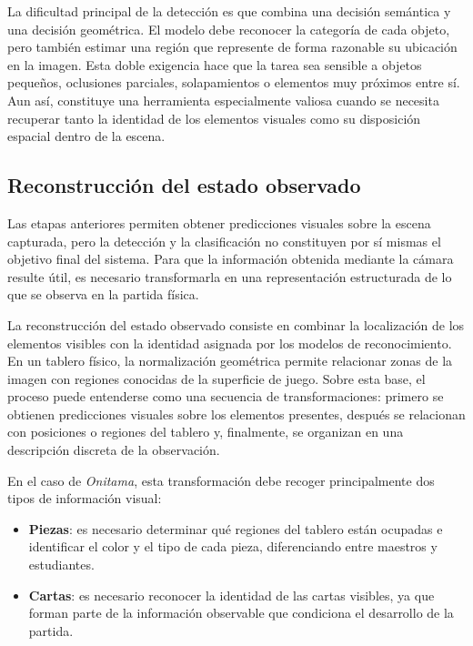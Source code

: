La dificultad principal de la detección es que combina una decisión semántica y una decisión geométrica. El modelo debe reconocer la categoría de cada objeto, pero también estimar una región que represente de forma razonable su ubicación en la imagen. Esta doble exigencia hace que la tarea sea sensible a objetos pequeños, oclusiones parciales, solapamientos o elementos muy próximos entre sí. Aun así, constituye una herramienta especialmente valiosa cuando se necesita recuperar tanto la identidad de los elementos visuales como su disposición espacial dentro de la escena.


\subsection{Reconstrucción del estado observado}

Las etapas anteriores permiten obtener predicciones visuales sobre la escena capturada, pero la detección y la clasificación no constituyen por sí mismas el objetivo final del sistema. Para que la información obtenida mediante la cámara resulte útil, es necesario transformarla en una representación estructurada de lo que se observa en la partida física.

La reconstrucción del estado observado consiste en combinar la localización de los elementos visibles con la identidad asignada por los modelos de reconocimiento. En un tablero físico, la normalización geométrica permite relacionar zonas de la imagen con regiones conocidas de la superficie de juego. Sobre esta base, el proceso puede entenderse como una secuencia de transformaciones: primero se obtienen predicciones visuales sobre los elementos presentes, después se relacionan con posiciones o regiones del tablero y, finalmente, se organizan en una descripción discreta de la observación.

En el caso de \textit{Onitama}, esta transformación debe recoger principalmente dos tipos de información visual:

\begin{itemize}
    \item \textbf{Piezas}: es necesario determinar qué regiones del tablero están ocupadas e identificar el color y el tipo de cada pieza, diferenciando entre maestros y estudiantes.
    \item \textbf{Cartas}: es necesario reconocer la identidad de las cartas visibles, ya que forman parte de la información observable que condiciona el desarrollo de la partida.
\end{itemize}

